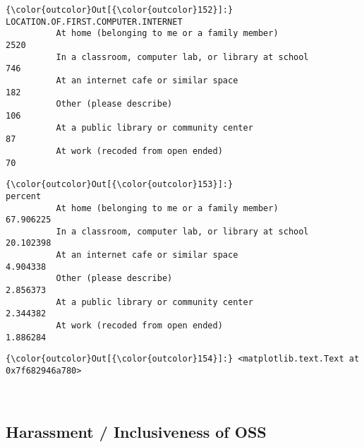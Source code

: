 \documentclass[11pt]{article}
\begin{document}
            \begin{Verbatim}[commandchars=\\\{\}]
{\color{outcolor}Out[{\color{outcolor}152}]:}                                                     LOCATION.OF.FIRST.COMPUTER.INTERNET
          At home (belonging to me or a family member)                                       2520
          In a classroom, computer lab, or library at school                                  746
          At an internet cafe or similar space                                                182
          Other (please describe)                                                             106
          At a public library or community center                                              87
          At work (recoded from open ended)                                                    70
\end{Verbatim}
        

            \begin{Verbatim}[commandchars=\\\{\}]
{\color{outcolor}Out[{\color{outcolor}153}]:}                                                       percent
          At home (belonging to me or a family member)        67.906225
          In a classroom, computer lab, or library at school  20.102398
          At an internet cafe or similar space                 4.904338
          Other (please describe)                              2.856373
          At a public library or community center              2.344382
          At work (recoded from open ended)                    1.886284
\end{Verbatim}
        

            \begin{Verbatim}[commandchars=\\\{\}]
{\color{outcolor}Out[{\color{outcolor}154}]:} <matplotlib.text.Text at 0x7f682946a780>
\end{Verbatim}
        
    \begin{center}
    \end{center}
    { \hspace*{\fill} \\}
    
    \subsection{Harassment / Inclusiveness of
OSS}\label{harassment-inclusiveness-of-oss}
\end{document}
